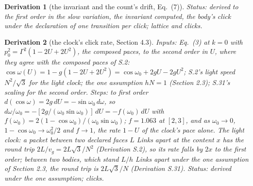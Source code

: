 \documentclass[pdflatex,sn-mathphys-num]{sn-jnl}
\theoremstyle{thmstyleone}
\newtheorem{derivation}{Derivation}
\begin{document}
\begin{derivation}[the invariant and the count's drift, Eq.~(7)]
 \emph{Status:} derived to the first order in the slow variation, the invariant computed, the body's click under the declaration of one transition per click; lattice and clicks.
\end{derivation}

\begin{derivation}[the clock's click rate, Section 4.3]
\emph{Inputs:} Eq.~(3) at $k = 0$ with $p_0^2 = \Gamma^2(1 - 2U + 2U^2)$, the composed paces, to the second order in $U$, where they agree with the composed paces of S.2: $\cos\omega(U) = 1 - g(1 - 2U + 2U^2) = \cos\omega_0 + 2gU - 2gU^2$; S.2's light speed $N^2 / \sqrt 3$ for the light clock; the one assumption $hN = 1$ (Section 2.3); S.31's scaling for the second order. \emph{Steps:} to first order $d(\cos\omega) = 2g\,dU = -\sin\omega_0\,d\omega$, so $d\omega / \omega_0 = -[2g / (\omega_0\sin\omega_0)]\,dU = -f(\omega_0)\,dU$ with $f(\omega_0) = 2(1 - \cos\omega_0) / (\omega_0\sin\omega_0)$; $f = 1.063$ at $[2, 3]$, and as $\omega_0 \to 0$, $1 - \cos\omega_0 \to \omega_0^2 / 2$ and $f \to 1$, the rate $1 - U$ of the clock's pace alone. \emph{The light clock:} a packet between two declared faces $L$ Links apart at the content $x$ has the round trip $2L / v_g = 2L\sqrt 3 / N^2$ (Derivation S.2), so its rate falls by $2x$ to the first order; between two bodies, which stand $L / h$ Links apart under the one assumption of Section 2.3, the round trip is $2L\sqrt 3 / N$ (Derivation S.31).
 \emph{Status:} derived under the one assumption; clicks.
\end{derivation}
\end{document}
